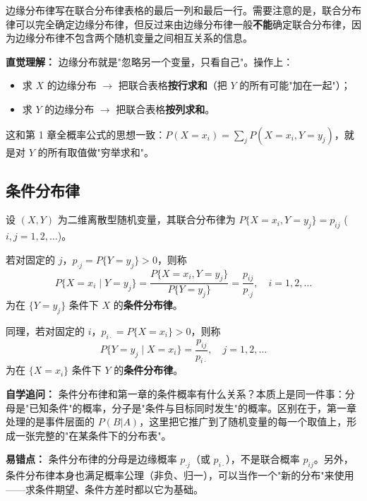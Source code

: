 ﻿\documentclass[lang=cn,11pt]{elegantbook}
\begin{document}
\begin{note}
边缘分布律写在联合分布律表格的最后一列和最后一行。需要注意的是，联合分布律可以完全确定边缘分布律，但反过来由边缘分布律一般\textbf{不能}确定联合分布律，因为边缘分布律不包含两个随机变量之间相互关系的信息。
\end{note}

\begin{note}
\textbf{直觉理解：} 边缘分布就是"忽略另一个变量，只看自己"。操作上：
\begin{itemize}
    \item 求 $X$ 的边缘分布 $\to$ 把联合表格\textbf{按行求和}（把 $Y$ 的所有可能"加在一起"）；
    \item 求 $Y$ 的边缘分布 $\to$ 把联合表格\textbf{按列求和}。
\end{itemize}
这和第 1 章全概率公式的思想一致：$P(X=x_i) = \sum_j P(X=x_i, Y=y_j)$，就是对 $Y$ 的所有取值做"穷举求和"。
\end{note}

\subsection{条件分布律}

\begin{definition}[条件分布律] \label{def:conditional-pm}
设 $(X,Y)$ 为二维离散型随机变量，其联合分布律为 $P\{X = x_i, Y = y_j\} = p_{ij}$ ($i,j = 1,2,\dots$)。

若对固定的 $j$，$p_{\cdot j} = P\{Y = y_j\} > 0$，则称
\[
P\{X = x_i \mid Y = y_j\} = \frac{P\{X = x_i, Y = y_j\}}{P\{Y = y_j\}} = \frac{p_{ij}}{p_{\cdot j}}, \quad i = 1,2,\dots
\]
为在 $\{Y = y_j\}$ 条件下 $X$ 的\textbf{条件分布律}。

同理，若对固定的 $i$，$p_{i\cdot} = P\{X = x_i\} > 0$，则称
\[
P\{Y = y_j \mid X = x_i\} = \frac{p_{ij}}{p_{i\cdot}}, \quad j = 1,2,\dots
\]
为在 $\{X = x_i\}$ 条件下 $Y$ 的\textbf{条件分布律}。
\end{definition}

\begin{note}
\textbf{自学追问：} 条件分布律和第一章的条件概率有什么关系？本质上是同一件事：分母是"已知条件"的概率，分子是"条件与目标同时发生"的概率。区别在于，第一章处理的是事件层面的 $P(B|A)$，这里把它推广到了随机变量的每一个取值上，形成一张完整的"在某条件下的分布表"。

\textbf{易错点：} 条件分布律的分母是边缘概率 $p_{\cdot j}$（或 $p_{i\cdot}$），不是联合概率 $p_{ij}$。另外，条件分布律本身也满足概率公理（非负、归一），可以当作一个"新的分布"来使用——求条件期望、条件方差时都以它为基础。
\end{note}
\end{document}
